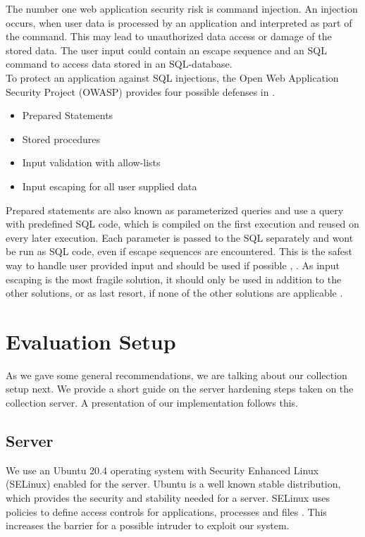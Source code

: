         The number one web application security risk is command injection.
        An injection occurs, when user data is processed by an application and interpreted as part of the command. This may lead to unauthorized data access or damage of the stored data. 
        The user input could contain an escape sequence and an SQL command to access data stored in an SQL-database.\\
        To protect an application against SQL injections, the Open Web Application Security Project (OWASP) provides four possible defenses in \cite{owasp_foundation_sql_2021}.
        \begin{itemize}
            \item Prepared Statements
            \item Stored procedures
            \item Input validation with allow-lists 
            \item Input escaping for all user supplied data
        \end{itemize}
        
        Prepared statements are also known as parameterized queries and use a query with predefined SQL code, which is compiled on the first execution and reused on every later execution. Each parameter is passed to the SQL separately and wont be run as SQL code, even if escape sequences are encountered.  This is the safest way to handle user provided input and should be used if possible \cite{owasp_foundation_sql_2021}, \cite{benita_preventing_2021}. As input escaping is the most fragile solution, it should only be used in addition to the other solutions, or as last resort, if none of the other solutions are applicable \cite{owasp_foundation_sql_2021}. 
        
%
\newpage

\section{Evaluation Setup}
\label{sec:measurement:eval_setup}
%
    As we gave some general recommendations, we are talking about our collection setup next.
    We provide a short guide on the server hardening steps taken on the collection server. A presentation of our implementation follows this.
    
    \subsection{Server}
        \label{subsec:measure:server}
        We use an Ubuntu 20.4 operating system with Security Enhanced Linux (SELinux) \cite{noauthor_what_nodate-1} enabled for the server.
        Ubuntu is a well known stable distribution, which provides the security and stability needed for a server. SELinux uses policies to define access controls for applications, processes and files \cite{noauthor_what_nodate-1}. This increases the barrier for a possible intruder to exploit our system.\\
        
